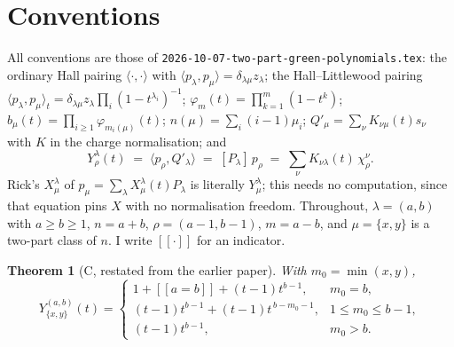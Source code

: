 \documentclass[11pt]{article}
\newtheorem{theorem}{Theorem}
\theoremstyle{definition}
\newcommand{\lam}{\lambda}
\newcommand{\Qp}{Q'}
\newcommand{\lb}{[\![}
\newcommand{\rb}{]\!]}
\begin{document}
\section{Conventions}

All conventions are those of \texttt{2026-10-07-two-part-green-polynomials.tex}: the ordinary Hall
pairing $\langle\cdot,\cdot\rangle$ with $\langle p_\lam,p_\mu\rangle=\delta_{\lam\mu}z_\lam$; the
Hall--Littlewood pairing $\langle p_\lam,p_\mu\rangle_t
=\delta_{\lam\mu}z_\lam\prod_i(1-t^{\lam_i})^{-1}$; $\varphi_m(t)=\prod_{k=1}^m(1-t^k)$;
$b_\mu(t)=\prod_{i\ge1}\varphi_{m_i(\mu)}(t)$; $n(\mu)=\sum_i(i-1)\mu_i$; $\Qp_\mu=\sum_\nu
K_{\nu\mu}(t)s_\nu$ with $K$ in the charge normalisation; and
\begin{equation}\label{eq:Ydef}
  Y^{\lam}_{\rho}(t)\;=\;\langle p_\rho,\Qp_\lam\rangle\;=\;[P_\lam]\,p_\rho
  \;=\;\sum_{\nu}K_{\nu\lam}(t)\,\chi^{\nu}_{\rho}.
\end{equation}
Rick's $X^\lam_\mu$ of $p_\mu=\sum_\lam X^\lam_\mu(t)P_\lam$ is literally $Y^\lam_\mu$; this
needs no computation, since that equation pins $X$ with no normalisation freedom.
Throughout, $\lam=(a,b)$ with $a\ge b\ge1$, $n=a+b$, $\rho=(a-1,b-1)$, $m=a-b$, and $\mu=\{x,y\}$
is a two-part class of $n$. I write $\lb\cdot\rb$ for an indicator.

\begin{theorem}[C, restated from the earlier paper]\label{thm:C}
With $m_0=\min(x,y)$,
\[
  Y^{(a,b)}_{\{x,y\}}(t)=
  \begin{cases}
    1+\lb a=b\rb+(t-1)t^{b-1}, & m_0=b,\\
    (t-1)t^{b-1}+(t-1)t^{\,b-m_0-1}, & 1\le m_0\le b-1,\\
    (t-1)t^{b-1}, & m_0>b.
  \end{cases}
\]
\end{theorem}
\end{document}
